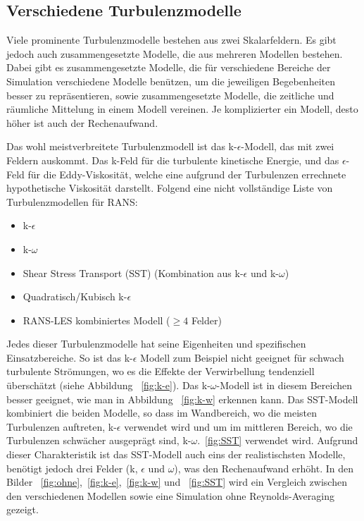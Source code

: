 \begin{refsection}
\subsection{Verschiedene Turbulenzmodelle}

Viele prominente Turbulenzmodelle bestehen aus zwei Skalarfeldern.
Es gibt jedoch auch zusammengesetzte Modelle, die aus mehreren Modellen bestehen.
Dabei gibt es zusammengesetzte Modelle, die für verschiedene Bereiche der Simulation verschiedene Modelle benützen,
um die jeweiligen Begebenheiten besser zu repräsentieren,
sowie zusammengesetzte Modelle, die zeitliche und räumliche Mittelung in einem Modell vereinen.
Je komplizierter ein Modell, desto höher ist auch der Rechenaufwand.

Das wohl meistverbreitete Turbulenzmodell ist das k-$\epsilon$-Modell, das mit zwei Feldern auskommt. Das k-Feld für die
turbulente kinetische Energie, und das $\epsilon$-Feld für die Eddy-Viskosität, welche eine aufgrund der Turbulenzen errechnete
hypothetische Viskosität darstellt.
Folgend eine nicht vollständige Liste von Turbulenzmodellen für RANS:

\begin{itemize}
    \item k-$\epsilon$
    \item k-$\omega$
    \item Shear Stress Transport (SST) (Kombination aus k-$\epsilon$ und k-$\omega$)
    \item Quadratisch/Kubisch k-$\epsilon$
    \item RANS-LES kombiniertes Modell ($\ge 4$ Felder)
\end{itemize}

Jedes dieser Turbulenzmodelle hat seine Eigenheiten und spezifischen Einsatzbereiche.
So ist das k-$\epsilon$ Modell zum Beispiel nicht geeignet für schwach turbulente Strömungen,
wo es die Effekte der Verwirbellung tendenziell überschätzt (siehe Abbildung ~\ref{fig:k-e}).
Das k-$\omega$-Modell ist in diesem Bereichen besser geeignet, wie man in Abbildung ~\ref{fig:k-w}
erkennen kann. Das SST-Modell kombiniert die beiden Modelle, so dass im Wandbereich,
wo die meisten Turbulenzen auftreten, k-$\epsilon$ verwendet wird und um im mittleren Bereich,
wo die Turbulenzen schwächer ausgeprägt sind, k-$\omega$.~\ref{fig:SST} verwendet wird.
Aufgrund dieser Charakteristik ist das SST-Modell auch eins der realistischsten Modelle,
benötigt jedoch drei Felder (k, $\epsilon$ und $\omega$), was den Rechenaufwand erhöht.
In den Bilder ~\ref{fig:ohne},~\ref{fig:k-e},~\ref{fig:k-w} und ~\ref{fig:SST}
wird ein Vergleich zwischen den verschiedenen Modellen sowie eine Simulation ohne
Reynolds-Averaging gezeigt.


\end{refsection}
